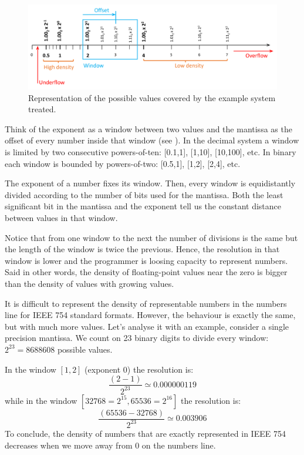 \begin{figure}[h]
    \centering
    \includegraphics[width= \textwidth]{./doc/Figures/DensityNumbers.png}
    \caption{Representation of the possible values covered by the example system treated.}
    \label{fig:DensityNumbers}
\end{figure}




\FloatBarrier
Think of the exponent as a window between two values 
and the mantissa as the offset of every number inside that window (see \cite{VisExpl}).
In the decimal system a window is limited by two consecutive powers-of-ten: [0.1,1], [1,10], [10,100], etc. 
In binary each window is bounded by powers-of-two: [0.5,1], [1,2], [2,4], etc. 

The exponent of a number fixes its window. Then, 
every window is equidistantly divided according to the number of bits used for the mantissa. 
Both the least significant bit in the mantissa and the exponent tell us the constant distance between values in that window. 

Notice that from one window to the next the number of divisions is the same but the length of the window is twice the previous.
Hence, the resolution in that window is lower and the programmer is loosing capacity to represent numbers. 
Said in other words, the density of floating-point values near the zero is bigger than 
the density of values with growing values. 





It is difficult to represent the density of representable numbers in the numbers line for IEEE 754 standard formats.
However, the behaviour is exactly the same, but with much more values.
Let's analyse it with an example, consider a single precision mantissa. 
We count on 23 binary digits to divide every window: $2^{23} = 8688608$ possible values. 

In the window $\left[1,2\right]$ (exponent $0$) the resolution is:
$$
\frac{\left(2-1\right)}{2^{23}} \simeq 0.000000119
$$ 
while in the window $\left[32768=2^{15},65536=2^{16}\right]$ the resolution is:
$$
\frac{\left(65536-32768\right)}{2^{23}} \simeq 0.003906
$$
To conclude, the density of numbers that are exactly represented in IEEE 754 decreases 
when we move away from 0 on the numbers line. 





